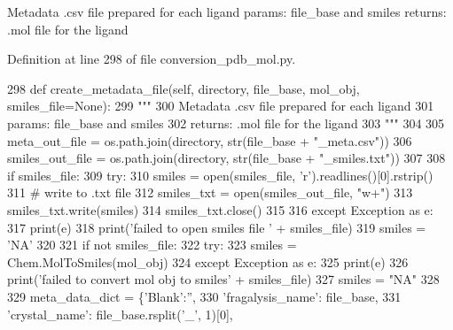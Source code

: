 \begin{DoxyVerb}Metadata .csv file prepared for each ligand
params: file_base and smiles
returns: .mol file for the ligand
\end{DoxyVerb}
 

Definition at line 298 of file conversion\+\_\+pdb\+\_\+mol.\+py.


\begin{DoxyCode}
298     \textcolor{keyword}{def }create\_metadata\_file(self, directory, file\_base, mol\_obj, smiles\_file=None):
299         \textcolor{stringliteral}{"""}
300 \textcolor{stringliteral}{        Metadata .csv file prepared for each ligand}
301 \textcolor{stringliteral}{        params: file\_base and smiles}
302 \textcolor{stringliteral}{        returns: .mol file for the ligand}
303 \textcolor{stringliteral}{        """}
304 
305         meta\_out\_file = os.path.join(directory, str(file\_base + \textcolor{stringliteral}{"\_meta.csv"}))
306         smiles\_out\_file = os.path.join(directory, str(file\_base + \textcolor{stringliteral}{"\_smiles.txt"}))
307 
308         \textcolor{keywordflow}{if} smiles\_file:
309             \textcolor{keywordflow}{try}:
310                 smiles = open(smiles\_file, \textcolor{stringliteral}{'r').readlines()[0].rstrip()}
311 \textcolor{stringliteral}{                }\textcolor{comment}{# write to .txt file}
312                 smiles\_txt = open(smiles\_out\_file, \textcolor{stringliteral}{"w+"})
313                 smiles\_txt.write(smiles)
314                 smiles\_txt.close()
315 
316             \textcolor{keywordflow}{except} Exception \textcolor{keyword}{as} e:
317                 print(e)
318                 print(\textcolor{stringliteral}{'failed to open smiles file '} + smiles\_file)
319                 smiles = \textcolor{stringliteral}{'NA'}
320 
321         \textcolor{keywordflow}{if} \textcolor{keywordflow}{not} smiles\_file:
322             \textcolor{keywordflow}{try}:
323                 smiles = Chem.MolToSmiles(mol\_obj)
324             \textcolor{keywordflow}{except} Exception \textcolor{keyword}{as} e:
325                 print(e)
326                 print(\textcolor{stringliteral}{'failed to convert mol obj to smiles'} + smiles\_file)
327                 smiles = \textcolor{stringliteral}{"NA"}
328 
329         meta\_data\_dict = \{\textcolor{stringliteral}{'Blank'}:\textcolor{stringliteral}{''},
330                           \textcolor{stringliteral}{'fragalysis\_name'}: file\_base,
331                           \textcolor{stringliteral}{'crystal\_name'}: file\_base.rsplit(\textcolor{stringliteral}{'\_'}, 1)[0],

\end{DoxyCode}
